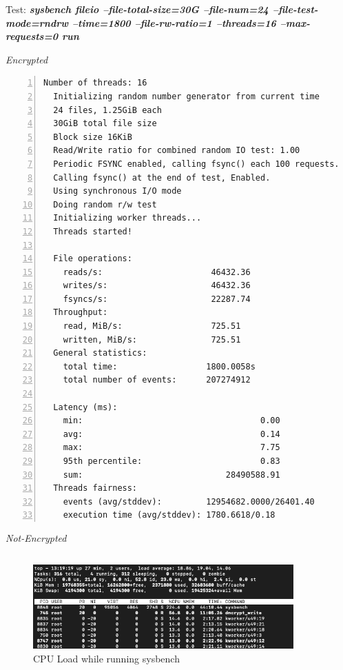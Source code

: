 \newpage
\begin{center}
  Test: \textbf{\textit{sysbench fileio --file-total-size=30G --file-num=24 --file-test-mode=rndrw --time=1800 --file-rw-ratio=1 --threads=16 --max-requests=0 run}}  
\end{center}
\vspace*{-\baselineskip}
\noindent\begin{minipage}[t]{0.45\linewidth}
  \centering
  \textit{Encrypted}
  \begin{lstlisting}[basicstyle=\tiny,frame=single, numbers=left, label=cpu_test1]
  Number of threads: 16
  Initializing random number generator from current time
  24 files, 1.25GiB each
  30GiB total file size
  Block size 16KiB
  Read/Write ratio for combined random IO test: 1.00
  Periodic FSYNC enabled, calling fsync() each 100 requests.
  Calling fsync() at the end of test, Enabled.
  Using synchronous I/O mode
  Doing random r/w test
  Initializing worker threads...
  Threads started!
  
  File operations:
    reads/s:                      46432.36
    writes/s:                     46432.36
    fsyncs/s:                     22287.74
  Throughput:
    read, MiB/s:                  725.51
    written, MiB/s:               725.51
  General statistics:
    total time:                  1800.0058s
    total number of events:      207274912
  
  Latency (ms):
    min:                                    0.00
    avg:                                    0.14
    max:                                    7.75
    95th percentile:                        0.83
    sum:                             28490588.91
  Threads fairness:
    events (avg/stddev):         12954682.0000/26401.40
    execution time (avg/stddev): 1780.6618/0.18
  \end{lstlisting}
\end{minipage}
\hspace{0.5cm}
\noindent\begin{minipage}[t]{0.45\linewidth}
  \centering
  \textit{Not-Encrypted}
  \begin{lstlisting}[basicstyle=\tiny,frame=single, label=cpu_test2]

  \end{lstlisting}
\end{minipage}
\begin{figure}
  \includegraphics[width=10cm]{images/image6.png}
  \centering
  \caption{CPU Load while running sysbench}
\end{figure}

